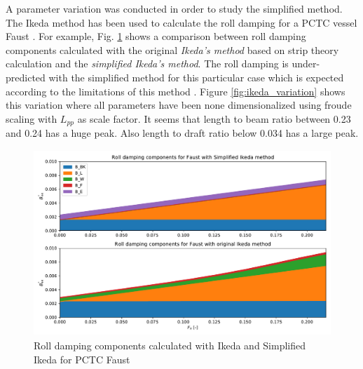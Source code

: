 A parameter variation was conducted in order to study the simplified method.
The Ikeda method has been used to calculate the roll damping for a PCTC vessel Faust \parencite{soder_assessment_2019}. For example, Fig. \ref{fig:ikeda_vs_simplified} shows a comparison between roll damping components calculated with the original \emph{Ikeda's method} based on strip theory calculation and the \emph{simplified Ikeda's method}. The roll damping is under-predicted with the simplified method for this particular case which is expected according to the limitations of this method  \parencite{kawahara_simple_2011}.
Figure \ref{fig:ikeda_variation} shows this variation where all parameters have been none dimensionalized using froude scaling with $L_{pp}$ as scale factor. 
It seems that length to beam ratio between 0.23 and 0.24 has a huge peak. Also length to draft ratio below 0.034 has a large peak. 

\begin{figure}[h]
    \centering
    \includegraphics[height=7cm, width=14cm]{figures/ikeda_vs_simplified.pdf}
    \caption{Roll damping components calculated with Ikeda and Simplified Ikeda for PCTC Faust}
    \label{fig:ikeda_vs_simplified}
\end{figure}

